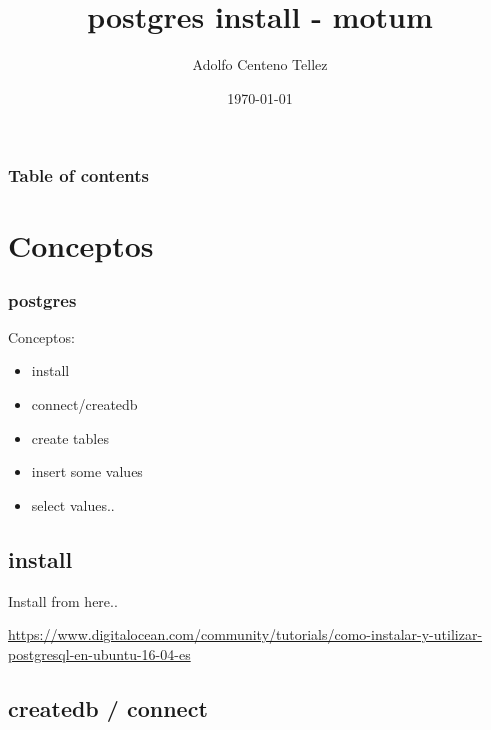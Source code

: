 \documentclass{beamer}
\begin{document}
\title{postgres install - motum}  
\author{Adolfo Centeno Tellez}
\date{\today} 

\begin{frame}
\titlepage
\end{frame}

\begin{frame}\frametitle{Table of contents}\tableofcontents
\end{frame} 




\section{Conceptos} 
\begin{frame}\frametitle{postgres} 

 Conceptos:
 
\begin{itemize}
\item install
\item connect/createdb    
\item create tables
\item insert some values
\item select values..
 

\end{itemize} 



\end{frame}

\subsection{install}

\begin{frame} 
Install from here..

\url{https://www.digitalocean.com/community/tutorials/como-instalar-y-utilizar-postgresql-en-ubuntu-16-04-es}


\end{frame}


\subsection{createdb / connect}

\end{document}

